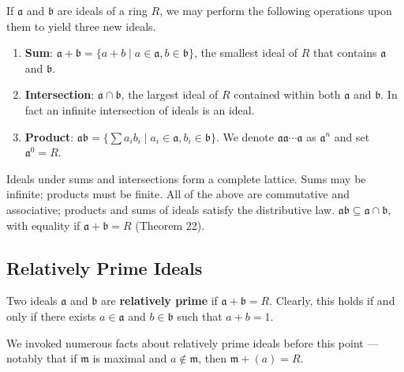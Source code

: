 \documentclass[11pt]{article}
\begin{document}
If $\mathfrak{a}$ and $\mathfrak{b}$ are ideals of a ring $R$, we may perform the following operations upon them to yield three new ideals.
\begin{enumerate}
	\item \textbf{Sum}: $\mathfrak{a} + \mathfrak{b} = \{ a + b \mid a \in \mathfrak{a}, b \in \mathfrak{b} \}$, the smallest ideal of $R$ that contains $\mathfrak{a}$ and $\mathfrak{b}$.
	\item \textbf{Intersection}: $\mathfrak{a} \cap \mathfrak{b}$, the largest ideal of $R$ contained within both $\mathfrak{a}$ and $\mathfrak{b}$. In fact an infinite intersection of ideals is an ideal.
	\item \textbf{Product}: $\mathfrak{a} \mathfrak{b} = \{ \sum\limits a_{i}b_{i} \mid a_{i} \in \mathfrak{a}, b_{i} \in \mathfrak{b} \}$. We denote $\mathfrak{a} \mathfrak{a} \cdots \mathfrak{a}$ as $\mathfrak{a}^{n}$ and set $\mathfrak{a}^{0} = R$.
\end{enumerate}

Ideals under sums and intersections form a complete lattice. Sums may be infinite; products must be finite. All of the above are commutative and associative; products and sums of ideals satisfy the distributive law. $\mathfrak{a}\mathfrak{b} \subseteq \mathfrak{a} \cap \mathfrak{b}$, with equality if $\mathfrak{a} + \mathfrak{b} = R$ (Theorem 22).


\subsection{Relatively Prime Ideals}

Two ideals $\mathfrak{a}$ and $\mathfrak{b}$ are \textbf{relatively prime} if $\mathfrak{a} + \mathfrak{b} = R$. Clearly, this holds if and only if there exists $a \in \mathfrak{a}$ and $b \in \mathfrak{b}$ such that $a + b = 1$. 

We invoked numerous facts about relatively prime ideals before this point --- notably that if $\mathfrak{m}$ is maximal and $a \notin \mathfrak{m}$, then $\mathfrak{m} + (a) = R$.

\newpage
\end{document}
